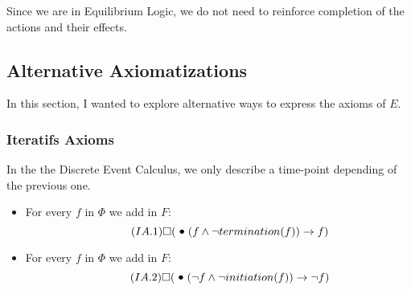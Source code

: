 Since we are in Equilibrium Logic, we do not need to reinforce completion of the actions and their effects.

\subsection{Alternative Axiomatizations}

In this section, I wanted to explore alternative ways to express the axioms of $E$.

\subsubsection{Iteratifs Axioms}\label{sec:iter}

In the the Discrete Event Calculus, we only describe a time-point depending of the previous one.

\begin{itemize}
  \item
    For every $f$ in $\Phi$ we add in $F$:
    \begin{equation}\tag{$IA.1$}
      \alwaysF(\previous(f \land \neg termination(f)) \rightarrow f)
    \end{equation}
  \item
    For every $f$ in $\Phi$ we add in $F$:
    \begin{equation}\tag{$IA.2$}
      \alwaysF(\previous(\neg f \land \neg initiation(f)) \rightarrow \neg f)
    \end{equation}
\end{itemize}

